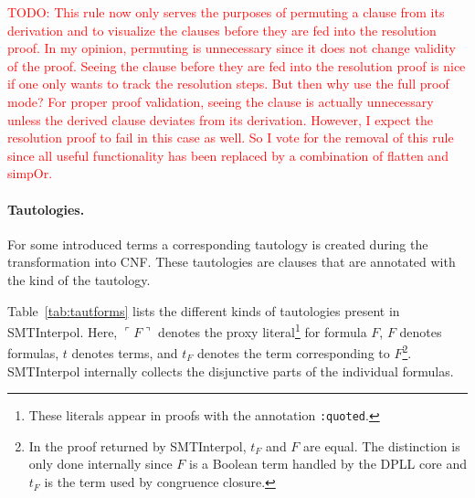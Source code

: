 \documentclass[a4paper]{article}
\newcommand\si{SMTInterpol\xspace}
\newcommand\todo[1]{\textcolor{red}{TODO: #1}}
\newcommand\quoted[1]{\ulcorner #1 \urcorner}
\begin{document}
\todo{This rule now only serves the purposes of permuting a clause from its
  derivation and to visualize the clauses before they are fed into the
  resolution proof.  In my opinion, permuting is unnecessary since it does not
  change validity of the proof.  Seeing the clause before they are fed into
  the resolution proof is nice if one only wants to track the resolution
  steps.  But then why use the full proof mode?  For proper proof validation,
  seeing the clause is actually unnecessary unless the derived clause deviates
  from its derivation.  However, I expect the resolution proof to fail in this
  case as well.  So I vote for the removal of this rule since all useful
  functionality has been replaced by a combination of flatten and simpOr.}

\paragraph{Tautologies.}  For some introduced terms a corresponding tautology
is created during the transformation into CNF.  These tautologies are
clauses that are annotated with the kind of the tautology.

Table~\ref{tab:tautforms} lists the different kinds of tautologies present
in \si.  Here, $\quoted{F}$ denotes the proxy
literal\footnote{These literals appear in proofs with the annotation
  \texttt{:quoted}.} for formula $F$, $F$ denotes formulas, $t$ denotes terms,
and $t_F$ denotes the term corresponding to $F$\footnote{In the proof returned
  by \si, $t_F$ and $F$ are equal.  The distinction is only done internally
  since $F$ is a Boolean term handled by the DPLL core and $t_F$ is the term
  used by congruence closure.}.
\si internally collects the disjunctive parts of the individual formulas.
\end{document}
